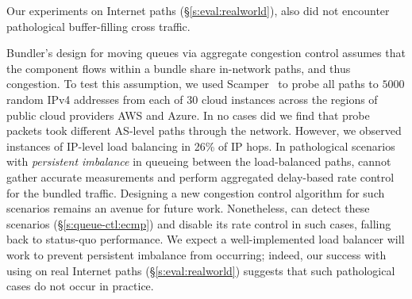 Our experiments on Internet paths (\S\ref{s:eval:realworld}), also did not encounter pathological buffer-filling cross traffic.  


 Bundler’s design for moving queues via aggregate congestion control assumes that the component flows within a bundle share in-network paths, and thus congestion. 
To test this assumption, we used Scamper~\cite{scamper} to probe all paths to $5000$ random IPv4 addresses from each of $30$ cloud instances across the regions of public cloud providers AWS and Azure. In no cases did we find that probe packets took different AS-level paths through the network.
However, we observed instances of IP-level load balancing in 26\% of IP hops. 
In pathological scenarios with \emph{persistent imbalance} in queueing between the load-balanced paths, \name cannot gather accurate measurements and perform aggregated delay-based rate control for the bundled traffic. 
Designing a new congestion control algorithm for such scenarios remains an avenue for future work.
Nonetheless, \name can detect these scenarios (\S\ref{s:queue-ctl:ecmp}) and disable its rate control in such cases, falling back to status-quo performance. 
We expect a well-implemented load balancer will work to prevent persistent imbalance from occurring; indeed, our success with using \name on real Internet paths (\S\ref{s:eval:realworld}) suggests that such pathological cases do not occur in practice.
